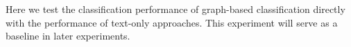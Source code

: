 Here we test the classification performance of graph-based classification directly with the performance of text-only approaches.
This experiment will serve as a baseline in later experiments.